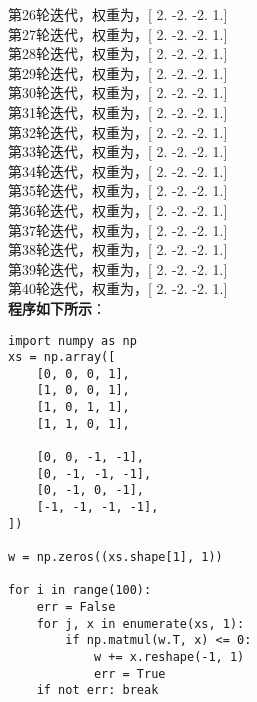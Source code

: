 \documentclass{article}
\begin{document}
\begin{CJK*}{UTF8}{gbsn}
    第26轮迭代，权重为，[ 2. -2. -2.  1.]\\
    第27轮迭代，权重为，[ 2. -2. -2.  1.]\\
    第28轮迭代，权重为，[ 2. -2. -2.  1.]\\
    第29轮迭代，权重为，[ 2. -2. -2.  1.]\\
    第30轮迭代，权重为，[ 2. -2. -2.  1.]\\
    第31轮迭代，权重为，[ 2. -2. -2.  1.]\\
    第32轮迭代，权重为，[ 2. -2. -2.  1.]\\
    第33轮迭代，权重为，[ 2. -2. -2.  1.]\\
    第34轮迭代，权重为，[ 2. -2. -2.  1.]\\
    第35轮迭代，权重为，[ 2. -2. -2.  1.]\\
    第36轮迭代，权重为，[ 2. -2. -2.  1.]\\
    第37轮迭代，权重为，[ 2. -2. -2.  1.]\\
    第38轮迭代，权重为，[ 2. -2. -2.  1.]\\
    第39轮迭代，权重为，[ 2. -2. -2.  1.]\\
    第40轮迭代，权重为，[ 2. -2. -2.  1.]\\
    \textbf{程序如下所示}：
    \lstset{language=python}
    \begin{lstlisting}
import numpy as np
xs = np.array([
    [0, 0, 0, 1],
    [1, 0, 0, 1],
    [1, 0, 1, 1],
    [1, 1, 0, 1],
    
    [0, 0, -1, -1],
    [0, -1, -1, -1],
    [0, -1, 0, -1],
    [-1, -1, -1, -1],
])

w = np.zeros((xs.shape[1], 1))

for i in range(100):
    err = False
    for j, x in enumerate(xs, 1):
        if np.matmul(w.T, x) <= 0:
            w += x.reshape(-1, 1)
            err = True
    if not err: break
    \end{lstlisting}


\end{CJK*}
\end{document}
